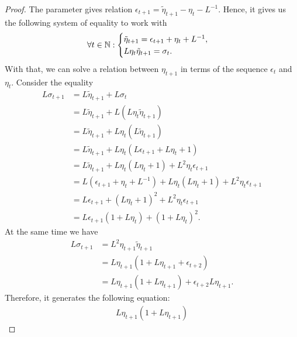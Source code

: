 \documentclass[12pt]{article}
\begin{document}
\begin{proof}
        The parameter gives relation $\epsilon_{t+1} = \tilde \eta_{t + 1} - \eta_t - L^{-1}$. 
        Hence, it gives us the following system of equality to work with 
        \begin{align*}
            \forall t \in \mathbb N: 
            \begin{cases}
                \tilde \eta_{t + 1} = \epsilon_{t + 1} + \eta_t + L^{-1}, 
                \\
                L \eta_t \tilde \eta_{t + 1} = \sigma_t.     
            \end{cases}
        \end{align*}
        With that, we can solve a relation between $\eta_{t + 1}$ in terms of the sequence $\epsilon_t$ and $\eta_t$.
        Consider the equality 
        \begin{align*}
            L \sigma_{t + 1} &= L \tilde \eta_{t + 1} + L \sigma_t
            \\
            &=
            L \tilde \eta_{t + 1}  + L (L \eta_t \tilde \eta_{t + 1})
            \\
            &= L \tilde \eta_{t+ 1} + L \eta_t (L \tilde \eta_{t + 1})
            \\
            &=  L \tilde \eta_{t+ 1} + L \eta_t (L \epsilon_{t + 1} + L \eta_t + 1)
            \\
            &=  L \tilde \eta_{t+ 1} + L \eta_t (L \eta_t + 1) + L^2 \eta_t \epsilon_{t + 1}
            \\
            &= L (\epsilon_{t +1} + \eta_t + L^{-1}) + L\eta_t(L \eta_t + 1) + L^2\eta_t \epsilon_{t + 1}
            \\
            &= L \epsilon_{t + 1} + (L\eta_t + 1)^2 + L^2\eta_t \epsilon_{t + 1}
            \\
            &= 
            L \epsilon_{t + 1}(1 + L \eta_t) + (1 + L \eta_t)^2. 
        \end{align*}
        At the same time we have 
        \begin{align*}
            L \sigma_{t + 1} &= L^2 \eta_{t + 1}\tilde \eta_{t + 1} 
            \\
            &= L\eta_{t + 1}(1 + L \eta_{t + 1} + \epsilon_{t + 2})
            \\
            &= L\eta_{t + 1}(1 + L \eta_{t + 1}) + \epsilon_{t + 2}L\eta_{t + 1}. 
        \end{align*}
        Therefore, it generates the following equation: 
        \begin{align*}
            L\eta_{t + 1} (1 + L \eta_{t + 1}) 

\end{align*}
\end{proof}
\end{document}
